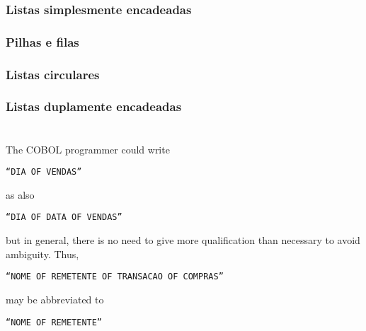 \subsubsection{Listas simplesmente encadeadas}

\subsubsection{Pilhas e filas}

\subsubsection{Listas circulares}

\subsubsection{Listas duplamente encadeadas}



\section{\insertlecture}


The COBOL programmer could write\\
\begin{center}
{\tt ``DIA {\bf OF} VENDAS''}
\end{center}
as also\\
\begin{center}
{\tt ``DIA {\bf OF} DATA {\bf OF} VENDAS''}
\end{center}
but in general, there is no need to give more qualification than
necessary to avoid ambiguity. Thus,
\begin{center}
{\tt ``NOME {\bf OF} REMETENTE {\bf OF} TRANSACAO {\bf OF} COMPRAS''}
\end{center}
may be abbreviated to\\
\begin{center}
{\tt ``NOME {\bf OF} REMETENTE''}
\end{center}

